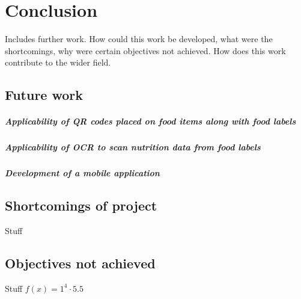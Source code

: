 \documentclass[11pt]{article}
\begin{document}
\section{Conclusion}
Includes further work. How could this work be developed, what were the shortcomings, why were certain objectives not achieved. How does this work contribute to the wider field.
	\subsection{Future work}
		\subparagraph{Applicability of QR codes placed on food items along with food 				labels}
		\subparagraph{Applicability of OCR to scan nutrition data from food labels}
		\subparagraph{Development of a mobile application}
	\subsection{Shortcomings of project}
	Stuff	
	\subsection{Objectives not achieved}
	Stuff
	$f(x)=1^4\cdot5.5$
\pagebreak
\end{document}
